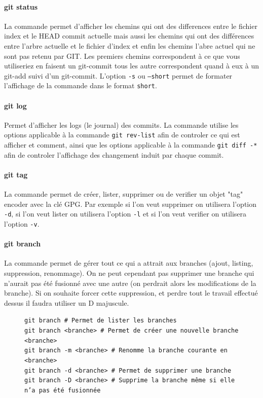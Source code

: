 \documentclass[11pt,canadien]{article}
\begin{document}
\paragraph{git status}La commande permet d'afficher les chemins qui ont des differences entre le fichier index et le HEAD commit actuelle mais aussi les chemins qui ont des différences entre l'arbre actuelle et le fichier d'index et enfin les chemins l'abre actuel qui ne sont pas retenu par GIT. Les premiers chemins correspondent à ce que vous utiliseriez en faisent un git-commit tous les autre correspondent quand à eux à un git-add suivi d'un git-commit. L'option \texttt{-s} ou \texttt{--short} permet de formater l'affichage de la commande dans le format \texttt{short}.

\paragraph{git log}Permet d'afficher les logs (le journal) des commits. La commande utilise les options applicable à la commande \texttt{git rev-list} afin de controler ce qui est afficher et comment, ainsi que les options applicable à la commande \texttt{git diff -*} afin de controler l'affichage des changement induit par  chaque commit.

\paragraph{git tag}La commande permet de créer, lister, supprimer ou de verifier un objet "tag" encoder avec la clé GPG. Par exemple si l'on veut supprimer on utilisera  l'option \texttt{-d}, si l'on veut lister on utilisera l'option \texttt{-l} et si l'on veut verifier on utilisera l'option \texttt{-v}.

\paragraph{git branch}La commande permet de gérer tout ce qui a attrait aux branches (ajout, listing, suppression, renommage). On ne peut cependant  pas supprimer une branche qui n'aurait pas été fusionné avec une autre (on perdrait alors les modifications de la branche). Si on souhaite forcer cette suppression, et perdre tout le travail effectué dessus il faudra utiliser un D majuscule.
\begin{figure}[H]
	\texttt{git branch               \# Permet de lister les branches \\
			git branch <branche>     \# Permet de créer une nouvelle branche <branche> \\
			git branch -m <branche>  \# Renomme la branche courante en <branche> \\
			git branch -d <branche>  \# Permet de supprimer une branche \\
			git branch -D <branche>  \# Supprime la branche même si elle n'a pas été fusionnée
	}
\end{figure}
\end{document}
